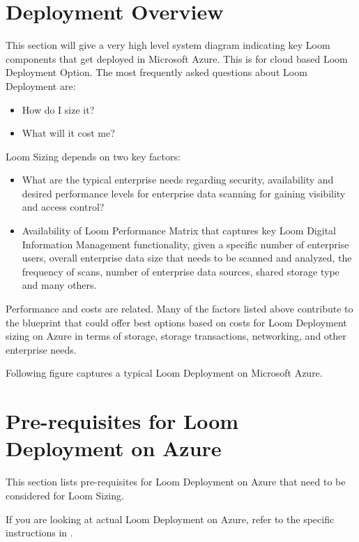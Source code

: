 \documentclass[letterpaper,10pt,english]{sphinxmanual}
\begin{document}
\section{Deployment Overview}
\label{\detokenize{loom_trbs_faq:deployment-overview}}
This section will give a very high level system diagram indicating key Loom components that get deployed in Microsoft Azure.  This is for cloud based Loom Deployment Option. The most frequently asked questions about Loom Deployment are:
\begin{itemize}
\item {} 
How do I size it?

\item {} 
What will it cost me?

\end{itemize}

Loom Sizing depends on two key factors:
\begin{itemize}
\item {} 
What are the typical enterprise needs regarding security, availability and desired performance levels for enterprise data scanning for gaining visibility and access control?

\item {} 
Availability of Loom Performance Matrix that captures key Loom Digital Information Management functionality, given a specific number of enterprise users, overall enterprise data size that needs to be scanned and analyzed, the frequency of scans, number of enterprise data sources, shared storage type and many others.

\end{itemize}

Performance and costs are related. Many of the factors listed above contribute to the blueprint that could offer best options based on costs for Loom Deployment sizing on Azure in terms of storage, storage transactions, networking, and other enterprise needs.

Following figure captures a typical Loom Deployment on Microsoft Azure.


\section{Pre-requisites for Loom Deployment on Azure}
\label{\detokenize{loom_trbs_faq:pre-requisites-for-loom-deployment-on-azure}}
This section lists pre-requisites for Loom Deployment on Azure that need to be considered for Loom Sizing.

If you are looking at actual Loom Deployment on Azure, refer to the specific instructions in .
\end{document}
